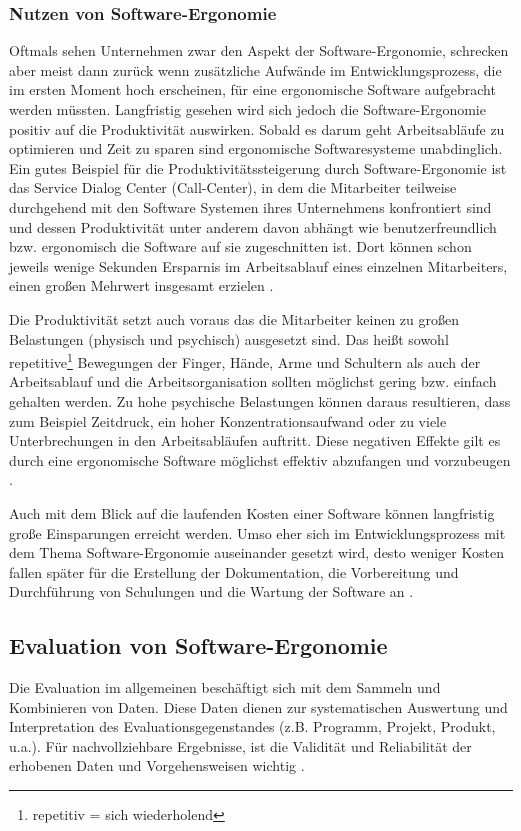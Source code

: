\subsubsection{Nutzen von Software-Ergonomie}
Oftmals sehen Unternehmen zwar den Aspekt der Software-Ergonomie, schrecken aber meist dann zurück wenn zusätzliche Aufwände im Entwicklungsprozess, die im ersten Moment hoch erscheinen, für eine ergonomische Software aufgebracht werden müssten. Langfristig gesehen wird sich jedoch die Software-Ergonomie positiv auf die Produktivität auswirken. Sobald es darum geht Arbeitsabläufe zu optimieren und Zeit zu sparen sind ergonomische Softwaresysteme unabdinglich. Ein gutes Beispiel für die Produktivitätssteigerung durch Software-Ergonomie ist das Service Dialog Center (Call-Center), in dem die Mitarbeiter teilweise durchgehend mit den Software Systemen ihres Unternehmens konfrontiert sind und dessen Produktivität unter anderem davon abhängt wie benutzerfreundlich bzw. ergonomisch die Software auf sie zugeschnitten ist. Dort können schon jeweils wenige Sekunden Ersparnis im Arbeitsablauf eines einzelnen Mitarbeiters, einen großen Mehrwert insgesamt erzielen \citep[vgl.][19]{Pruemper_Harten2007}.

Die Produktivität setzt auch voraus das die Mitarbeiter keinen zu großen Belastungen (physisch und psychisch) ausgesetzt sind. Das heißt sowohl repetitive\footnote{repetitiv = sich wiederholend} Bewegungen der Finger, Hände, Arme und Schultern als auch der Arbeitsablauf und die Arbeitsorganisation sollten möglichst gering bzw. einfach gehalten werden. Zu hohe psychische Belastungen können daraus resultieren, dass zum Beispiel Zeitdruck, ein hoher Konzentrationsaufwand oder zu viele Unterbrechungen in den Arbeitsabläufen auftritt. Diese negativen Effekte gilt es durch eine ergonomische Software möglichst effektiv abzufangen und vorzubeugen \citep[vgl.][19]{Pruemper_Harten2007}.

Auch mit dem Blick auf die laufenden Kosten einer Software können langfristig große Einsparungen erreicht werden. Umso eher sich im Entwicklungsprozess mit dem Thema Software-Ergonomie auseinander gesetzt wird, desto weniger Kosten fallen später für die Erstellung der Dokumentation, die Vorbereitung und Durchführung von Schulungen und die Wartung der Software an \citep[vgl.][19]{Pruemper_Harten2007}.

\subsection{Evaluation von Software-Ergonomie}
Die Evaluation im allgemeinen beschäftigt sich mit dem Sammeln und Kombinieren von Daten. Diese Daten dienen zur systematischen Auswertung und Interpretation des Evaluationsgegenstandes (z.B. Programm, Projekt, Produkt, u.a.). Für nachvollziehbare Ergebnisse, ist die Validität und Reliabilität der erhobenen Daten und Vorgehensweisen wichtig \citep[vgl.][7]{Hegner2003}.

